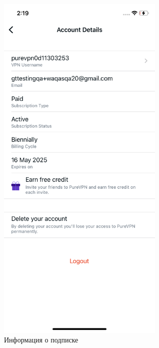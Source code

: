 \begin{itemize}
\begin{figure}[H]
\includegraphics[width=8cm]{49.png}
\centering
\caption{Информация о подписке}
\label{fig:68}
\end{figure}
\end{itemize}


 